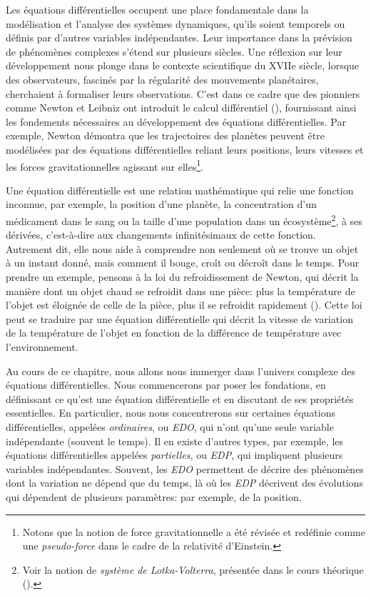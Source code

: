         Les équations différentielles occupent une place fondamentale dans la modélisation et l’analyse des systèmes dynamiques, qu'ils soient temporels ou définis par d'autres variables indépendantes. Leur importance dans la prévision de phénomènes complexes s’étend sur plusieurs siècles. Une réflexion sur leur développement nous plonge dans le contexte scientifique du XVIIe siècle, lorsque des observateurs, fascinés par la régularité des mouvements planétaires, cherchaient à formaliser leurs observations. C’est dans ce cadre que des pionniers comme Newton et Leibniz ont introduit le calcul différentiel (\cite{Edwards1979}), fournissant ainsi les fondements nécessaires au développement des équations différentielles. Par exemple, Newton démontra que les trajectoires des planètes peuvent être modélisées par des équations différentielles reliant leurs positions, leurs vitesses et les forces gravitationnelles agissant sur elles\footnote{Notons que la notion de force gravitationnelle a été révisée et redéfinie comme une \textit{pseudo-force} dans le cadre de la relativité d'Einstein.}.
    
        Une équation différentielle est une relation mathématique qui relie une fonction inconnue, par exemple, la position d'une planète, la concentration d'un médicament dans le sang ou la taille d'une population dans un écosystème\footnote{Voir la notion de \textit{système de Lotka-Volterra}, présentée dans le cours théorique (\cite{infof305}).}, à ses dérivées, c’est-à-dire aux changements infinitésimaux de cette fonction. Autrement dit, elle nous aide à comprendre non seulement où se trouve un objet à un instant donné, mais comment il bouge, croît ou décroît dans le temps. Pour prendre un exemple, pensons à la loi du refroidissement de Newton, qui décrit la manière dont un objet chaud se refroidit dans une pièce: plus la température de l’objet est éloignée de celle de la pièce, plus il se refroidit rapidement (\cite{Newton1701}). Cette loi peut se traduire par une équation différentielle qui décrit la vitesse de variation de la température de l’objet en fonction de la différence de température avec l'environnement.
        
        Au cours de ce chapitre, nous allons nous immerger dans l'univers complexe des équations différentielles. Nous commencerons par poser les fondations, en définissant ce qu'est une équation différentielle et en discutant de ses propriétés essentielles. En particulier, nous nous concentrerons sur certaines équations différentielles, appelées \textit{ordinaires}, ou \textit{EDO}, qui n’ont qu’une seule variable indépendante (souvent le temps). Il en existe d’autres types, par exemple, les équations différentielles appelées \textit{partielles}, ou \textit{EDP}, qui impliquent plusieurs variables indépendantes. Souvent, les \textit{EDO} permettent de décrire des phénomènes dont la variation ne dépend que du temps, là où les \textit{EDP} décrivent des évolutions qui dépendent de plusieurs paramètres: par exemple, de la position.
        
